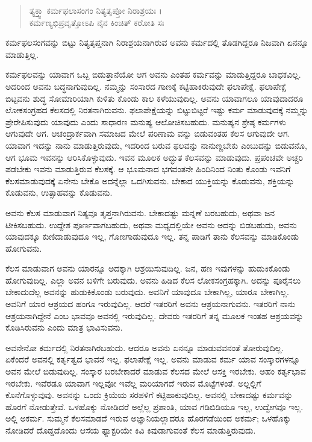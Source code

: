 \begin{verse}
ತ್ಯಕ್ತ್ವಾ ಕರ್ಮಫಲಾಸಂಗಂ ನಿತ್ಯತೃಪ್ತೋ ನಿರಾಶ್ರಯಃ ।\\ಕರ್ಮಣ್ಯಭಿಪ್ರವೃತ್ತೋಽಪಿ ನೈನ ಕಿಂಚಿತ್ ಕರೋತಿ ಸಃ 
\end{verse}

{\small ಕರ್ಮಫಲಸಂಗವನ್ನು ಬಿಟ್ಟು ನಿತ್ಯತೃಪ್ತನಾಗಿ ನಿರಾಶ್ರಯನಾಗಿರುವ ಅವನು ಕರ್ಮದಲ್ಲಿ ತೊಡಗಿದ್ದರೂ ನಿಜವಾಗಿ ಏನನ್ನೂ ಮಾಡುತ್ತಿಲ್ಲ.}

ಕರ್ಮಫಲವನ್ನು ಯಾವಾಗ ಒಬ್ಬ ಬಿಡುತ್ತಾನೆಯೋ ಆಗ ಅವನು ಎಂತಹ ಕರ್ಮವನ್ನು ಮಾಡುತ್ತಿದ್ದರೂ ಬಾಧಕವಿಲ್ಲ. ಅದರಿಂದ ಅವನು ಬದ್ಧನಾಗುವುದಿಲ್ಲ. ನಮ್ಮನ್ನು ಸಂಸಾರದ ಗಾಣಕ್ಕೆ ಕಟ್ಟಿಹಾಕಿರುವುದೇ ಫಲಾಪೇಕ್ಷೆ. ಫಲಾಪೇಕ್ಷೆ ಬಿಟ್ಟವನು ಶುದ್ಧ ಸೋಮಾರಿಯಾಗಿ ಕುಳಿತು ಕೊಂಡು ಕಾಲ ಕಳೆಯುವುದಿಲ್ಲ. ಅವನು ಯಾವಾಗಲೂ ಯಾವುದಾದರೂ ಲೋಕಸಂಗ್ರಹದ ಕೆಲಸದಲ್ಲಿ ನಿರತನಾಗಿರುವನು. ಫಲಾಪೇಕ್ಷೆಯನ್ನು ಬಿಟ್ಟುಬಿಟ್ಟರೆ ಇಷ್ಟು ಕರ್ಮ ಮಾಡುವುದಕ್ಕೆ ನಮ್ಮನ್ನು ಪ್ರೇರೇಪಿಸುವುದು ಯಾವುದು ಎಂದು ಸಾಧಾರಣ ಮನುಷ್ಯ ಆಲೋಚಿಸಬಹುದು. ಮನುಷ್ಯನ ಶ್ರೇಷ್ಠ ಕರ್ಮಗಳು ಆಗುವುದೇ ಆಗ. ಆಚಂದ್ರಾರ್ಕವಾಗಿ ಸಮಾಜದ ಮೇಲೆ ಪರಿಣಾಮ ವನ್ನು ಬಿಡುವಂತಹ ಕೆಲಸ ಆಗುವುದೇ ಆಗ. ಯಾವಾಗ ಇದನ್ನು ನಾನು ಮಾಡುತ್ತಿರುವುದು, ಇದರಿಂದ ಬರುವ ಫಲವನ್ನು ನಾನುಣ್ಣಬೇಕು ಎಂಬುದನ್ನು ಬಿಡುವನೊ, ಆಗ ಭೂಮ ಇವನನ್ನು ಆರಿಸಿಕೊಳ್ಳುವುದು. ಇವನ ಮೂಲಕ ಅದ್ಭುತ ಕೆಲಸವನ್ನು ಮಾಡುವುದು. ಪ್ರಪಂಚವೇ ಅಚ್ಚರಿ ಪಡಬೇಕು ಇವನು ಮಾಡುತ್ತಿರುವ ಕೆಲಸಕ್ಕೆ. ಆ ಭೂಮನಾದ ಭಗವಂತನೇ ಹಿಂದಿನಿಂದ ನಿಂತು ಕೊಂಡು ಇವನಿಗೆ ಕೆಲಸಮಾಡುವುದಕ್ಕೆ ಏನೇನು ಬೇಕೊ ಅದನ್ನೆಲ್ಲಾ ಒದಗಿಸುವನು. ಬೇಕಾದ ಯುಕ್ತಿಯನ್ನು ಕೊಡುವನು, ಶಕ್ತಿಯನ್ನು ಕೊಡುವನು, ಉತ್ಸಾಹವನ್ನು ಕೊಡುವನು.

ಅವನು ಕೆಲಸ ಮಾಡುವಾಗ ನಿತ್ಯವೂ ತೃಪ್ತನಾಗಿರುವನು. ಬೇಕಾದಷ್ಟು ಮನ್ನಣೆ ಬರಬಹುದು, ಅಥವಾ ಜನ ಟೀಕಿಸಬಹುದು. ಉದ್ದೇಶ ಪೂರ್ಣವಾಗಬಹುದು, ಅಥವಾ ಮಧ್ಯದಲ್ಲಿಯೇ ಅವನು ಅದನ್ನು ಬಿಡಬಹುದು, ಅವನು ಯಾವುದಕ್ಕೂ ಕುಣಿದಾಡುವುದೂ ಇಲ್ಲ, ಗೊಣಗಾಡುವುದೂ ಇಲ್ಲ. ತನ್ನ ಪಾಡಿಗೆ ತಾನು ಕೆಲಸವನ್ನು ಮಾಡಿಕೊಂಡು ಹೋಗುವನು.

ಕೆಲಸ ಮಾಡುವಾಗ ಅವನು ಯಾರನ್ನೂ ಅದಕ್ಕಾಗಿ ಆಶ್ರಯಿಸುವುದಿಲ್ಲ. ಜನ, ಹಣ ಇವುಗಳನ್ನು ಹುಡುಕಿಕೊಂಡು ಹೋಗುವುದಿಲ್ಲ. ಎಲ್ಲಾ ಅವನ ಬಳಿಗೇ ಬರುವುದು. ಅವನು ಹಿಡಿದ ಕೆಲಸ ಲೋಕಸಂಗ್ರಹಕ್ಕಾಗಿ. ಅದನ್ನು ಪೂರೈಸಲು ಬೇಕಾದುದೆಲ್ಲ ಅವನನ್ನು ಹುಡುಕಿಕೊಂಡು ಬರುವುದು. ಅವನಿಗೆ ಯಾವುದೂ ಬೇಕಾಗಿಲ್ಲ, ಯಾರೂ ಬೇಕಾಗಿಲ್ಲ. ಅವನಿಗೆ ಯಾರ ಆಶ್ರಯದ ಹಂಗೂ ಇರುವುದಿಲ್ಲ. ಆದರೆ ಇತರರಿಗೆ ಅವನು ಆಶ್ರಯನಾಗುವನು. ಇತರರಿಗೆ ನಾನು ಆಶ್ರಯನಾಗಿದ್ದೇನೆ ಎಂಬ ಭಾವವೂ ಅವನಲ್ಲಿ ಇರುವುದಿಲ್ಲ. ದೇವರು ಇತರರಿಗೆ ತನ್ನ ಮೂಲಕ ಇಂತಹ ಆಶ್ರಯವನ್ನು ಕೊಡಿಸಿರುವನು ಎಂದು ಮಾತ್ರ ಭಾವಿಸುವನು.

ಅವನೇನೋ ಕರ್ಮದಲ್ಲಿ ನಿರತನಾಗಿರಬಹುದು. ಆದರೂ ಅವನು ಏನನ್ನೂ ಮಾಡುವವನಂತೆ ತೋರುವುದಿಲ್ಲ. ಏಕೆಂದರೆ ಅವನಲ್ಲಿ ಕರ್ತೃತ್ವದ ಭಾವನೆ ಇಲ್ಲ. ಫಲಾಪೇಕ್ಷೆ ಇಲ್ಲ. ಅವನು ಮಾಡುವ ಕರ್ಮ ಯಾವ ಸಂಸ್ಕಾರಗಳನ್ನೂ ಅವನ ಮೇಲೆ ಬಿಡುವುದಿಲ್ಲ. ಸಂಸ್ಕಾರ ಬರಬೇಕಾದರೆ ಮಾಡುವ ಕೆಲಸದ ಮೇಲೆ ಆಸಕ್ತಿ ಇರಬೇಕು. ಅಹಂ ಕರ್ತೃಭಾವ ಇರಬೇಕು. ಇವೆರಡೂ ಯಾವಾಗ ಇಲ್ಲವೋ ಇವೆಲ್ಲ ಮರಿಯಾಗದೆ ಇರುವ ಮೊಟ್ಟೆಗಳಂತೆ. ಅಲ್ಲಲ್ಲಿಗೆ ಕೊನೆಗೊಳ್ಳುವುವು. ಅವನನ್ನು ಒಂದು ಕ್ರಿಯೆಯ ಸರಪಳಿಗೆ ಕಟ್ಟಿಹಾಕುವುದಿಲ್ಲ. ಅವನಲ್ಲಿ ಬೇಕಾದಷ್ಟು ಕರ್ಮವನ್ನು ಹೊರಗೆ ನೋಡುತ್ತೇವೆ. ಒಳಹೊಕ್ಕು ನೋಡಿದರೆ ಅಲ್ಲೆಲ್ಲ ಪ್ರಶಾಂತಿ, ಯಾವ ಗಡಿಬಿಡಿಯೂ ಇಲ್ಲ, ಉದ್ವೇಗವೂ ಇಲ್ಲ. ಅಲ್ಲಿ ಅಕರ್ಮ. ಸುಮ್ಮನೆ ಕೆಲಸಮಾಡದೆ ಇರುವ ಅಜ್ಞಾನಿಯಲ್ಲಾದರೂ ಹೊರಗಡೆಯಿಂದ ಅಕರ್ಮ; ಒಳಹೊಕ್ಕು ನೋಡಿದರೆ ದೊಡ್ಡದೊಂದು ಆಸೆಯ ಫ್ಯಾಕ್ಟರಿಯೇ ಕಿವಿ ಕಿವುಡಾಗುವಂತೆ ಕೆಲಸ ಮಾಡುತ್ತಿರುವುದು.

